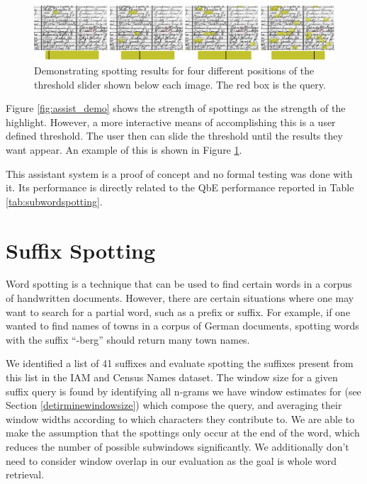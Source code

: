 \documentclass[ms,electronic,twosidetoc,letterpaper,chaptercenter,parttop,lof,lot]{byumsphd}
\begin{document}
\begin{figure}
    \centering
    \includegraphics[width=.99\textwidth]{slider}
    \caption{Demonstrating spotting results for four different positions of the threshold slider shown below each image. The red box is the query.}
    \label{fig:slider}
\end{figure}

Figure \ref{fig:assist_demo} shows the strength of spottings as the strength of the highlight. However, a more interactive means of accomplishing this is a user defined threshold. The user then can slide the threshold until the results they want appear. An example of this is shown in Figure \ref{fig:slider}.

This assistant system is a proof of concept and no formal testing was done with it. Its performance is directly related to the QbE performance reported in Table \ref{tab:subwordspotting}. 






\section{Suffix Spotting}
Word spotting is a technique that can be used to find certain words in a corpus of handwritten documents. However, there are certain situations where one may want to search for a partial word, such as a prefix or suffix. For example, if one wanted to find names of towns in a corpus of German documents, spotting words with the suffix ``-berg'' should return many town names.

We identified a list of 41 suffixes and evaluate spotting the suffixes present from this list in the IAM and Census Names dataset. 
 The window size for a given suffix query is found by identifying all n-grams we have window estimates for (see Section \ref{detirminewindowsize}) which compose the query, and averaging their window widths according to which characters they contribute to.
We are able to make the assumption that the spottings only occur at the end of the word, which reduces the number of possible subwindows significantly. We additionally don't need to consider window overlap in our evaluation as the goal is whole word retrieval.
\end{document}
